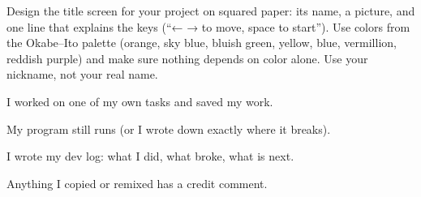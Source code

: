 \begin{creative}
Design the title screen for your project on squared paper: its name, a picture, and one line that
explains the keys (\enquote{← → to move, space to start}). Use colors from the Okabe--Ito palette
(orange, sky blue, bluish green, yellow, blue, vermillion, reddish purple) and make sure nothing
depends on color alone. Use your nickname, not your real name.
\answerspace{5cm}
\end{creative}

\begin{selfcheck}
  \item I worked on one of my own tasks and saved my work.
  \item My program still runs (or I wrote down exactly where it breaks).
  \item I wrote my dev log: what I did, what broke, what is next.
  \item Anything I copied or remixed has a credit comment.
\end{selfcheck}
